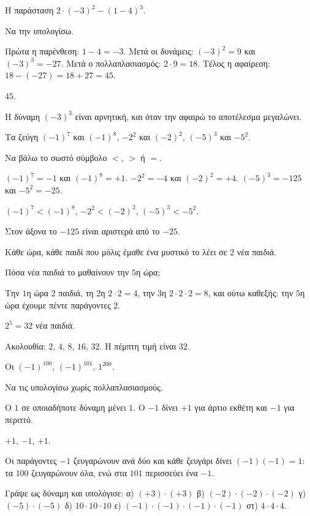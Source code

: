 \tixero Η παράσταση $2\cdot(-3)^2-(1-4)^3$.\par
\tithelo Να την υπολογίσω.\par
\possindeo Πρώτα η παρένθεση: $1-4=-3$. Μετά οι δυνάμεις: $(-3)^2=9$ και $(-3)^3=-27$. Μετά ο πολλαπλασιασμός: $2\cdot9=18$. Τέλος η αφαίρεση: $18-(-27)=18+27=45$.\par
\apantisi $45$.\par
\elegxos Η δύναμη $(-3)^3$ είναι αρνητική, και όταν την αφαιρώ το αποτέλεσμα μεγαλώνει.

\tixero Τα ζεύγη $(-1)^7$ και $(-1)^8$, $-2^2$ και $(-2)^2$, $(-5)^3$ και $-5^2$.\par
\tithelo Να βάλω το σωστό σύμβολο $<$, $>$ ή $=$.\par
\possindeo $(-1)^7=-1$ και $(-1)^8=+1$. $-2^2=-4$ και $(-2)^2=+4$. $(-5)^3=-125$ και $-5^2=-25$.\par
\apantisi $(-1)^7<(-1)^8$, $-2^2<(-2)^2$, $(-5)^3<-5^2$.\par
\elegxos Στον άξονα το $-125$ είναι αριστερά από το $-25$.

\tixero Κάθε ώρα, κάθε παιδί που μόλις έμαθε ένα μυστικό το λέει σε $2$ νέα παιδιά.\par
\tithelo Πόσα νέα παιδιά το μαθαίνουν την $5$η ώρα;\par
\possindeo Την $1$η ώρα $2$ παιδιά, τη $2$η $2\cdot2=4$, την $3$η $2\cdot2\cdot2=8$, και ούτω καθεξής: την $5$η ώρα έχουμε πέντε παράγοντες $2$.\par
\apantisi $2^5=32$ νέα παιδιά.\par
\elegxos Ακολουθία: $2,\,4,\,8,\,16,\,32$. Η πέμπτη τιμή είναι $32$.

\tixero Οι $(-1)^{100}$, $(-1)^{101}$, $1^{200}$.\par
\tithelo Να τις υπολογίσω χωρίς πολλαπλασιασμούς.\par
\possindeo Ο $1$ σε οποιαδήποτε δύναμη μένει $1$. Ο $-1$ δίνει $+1$ για άρτιο εκθέτη και $-1$ για περιττό.\par
\apantisi $+1$, $-1$, $+1$.\par
\elegxos Οι παράγοντες $-1$ ζευγαρώνουν ανά δύο και κάθε ζευγάρι δίνει $(-1)(-1)=1$: τα $100$ ζευγαρώνουν όλα, ενώ στα $101$ περισσεύει ένα $-1$.



\ex Γράψε ως δύναμη και υπολόγισε: α) $(+3)\cdot(+3)$ \quad β) $(-2)\cdot(-2)\cdot(-2)$ \quad γ) $(-5)\cdot(-5)$ \quad δ) $10\cdot10\cdot10$ \quad ε) $(-1)\cdot(-1)\cdot(-1)\cdot(-1)$ \quad στ) $4\cdot4\cdot4$.

